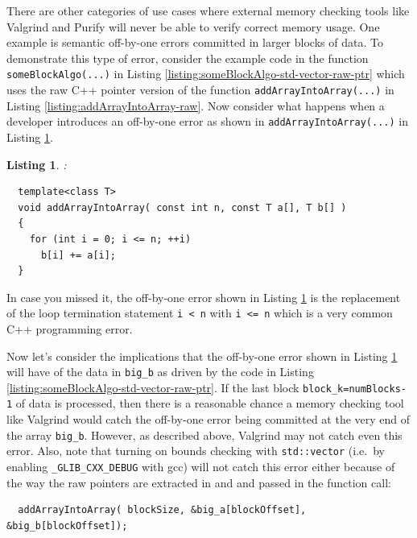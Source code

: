 \documentclass[pdf,ps2pdf,11pt]{SANDreport}
\newtheorem{listing}{Listing}
\begin{document}
There are other categories of use cases where external memory checking
tools like Valgrind and Purify will never be able to verify correct
memory usage.  One example is semantic off-by-one errors committed in
larger blocks of data.  To demonstrate this type of error, consider
the example code in the function {}\texttt{someBlockAlgo(...)} in
Listing {}\ref{listing:someBlockAlgo-std-vector-raw-ptr} which uses
the raw C++ pointer version of the function
{}\texttt{addArrayIntoArray(...)} in Listing
{}\ref{listing:addArrayIntoArray-raw}.  Now consider what happens when
a developer introduces an off-by-one error as shown in
{}\texttt{addArrayIntoArray(...)} in Listing
{}\ref{listing:addArrayIntoArray_rawError}.

\begin{listing}:\\
\label{listing:addArrayIntoArray_rawError}
{\small\begin{verbatim}
  template<class T>
  void addArrayIntoArray( const int n, const T a[], T b[] )
  {
    for (int i = 0; i <= n; ++i)
      b[i] += a[i];
  }
\end{verbatim}}
\end{listing}

In case you missed it, the off-by-one error shown in Listing
{}\ref{listing:addArrayIntoArray_rawError} is the replacement of the
loop termination statement {}\texttt{i < n} with {}\texttt{i <= n}
which is a very common C++ programming error.

Now let's consider the implications that the off-by-one error shown in
Listing {}\ref{listing:addArrayIntoArray_rawError} will have of the
data in {}\texttt{big\_b} as driven by the code in Listing
{}\ref{listing:someBlockAlgo-std-vector-raw-ptr}.  If the last block
{}\texttt{block\_k=numBlocks-1} of data is processed, then there is a
reasonable chance a memory checking tool like Valgrind would catch the
off-by-one error being committed at the very end of the array
{}\texttt{big\_b}.  However, as described above, Valgrind may not
catch even this error.  Also, note that turning on bounds checking
with {}\texttt{std::vector} (i.e.\ by enabling
{}\texttt{\_GLIB\_CXX\_DEBUG} with gcc) will not catch this error
either because of the way the raw pointers are extracted in and and
passed in the function call:

{\small\begin{verbatim}
  addArrayIntoArray( blockSize, &big_a[blockOffset], &big_b[blockOffset]);
\end{verbatim}}
\end{document}
